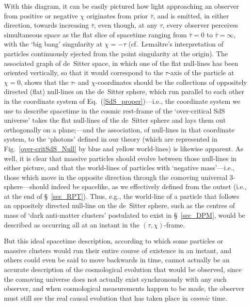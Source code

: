 With this diagram, it can be easily pictured how light approaching an observer from positive or negative $\chi$ originates from prior $\bar\tau$, and is emitted, in either direction, towards increasing $\bar\tau$, even though, at any $\tau$, every observer perceives simultaneous space as the flat slice of spacetime ranging from $\bar\tau=0$ to $\bar\tau=\infty$, with the `big bang' singularity at $\chi=-\tau$ (cf.~Lema\^{i}tre's interpretation of particles continuously ejected from the point singularity at the origin). The associated graph of de~Sitter space, in which one of the flat null-lines has been oriented vertically, so that it would correspond to the $\tau$-axis of the particle at $\chi=0$, shows that the $\tau$- and $\chi$-coordinates should be the collections of oppositely directed (flat) null-lines on the de~Sitter sphere, which run parallel to each other in the coordinate system of Eq.~(\ref{SdS_proper})---i.e., the coordinate system we use to describe spacetime in the cosmic rest-frame of the `over-critical SdS universe' takes the flat null-lines of the de~Sitter sphere and lays them out orthogonally on a plane;---and the association, of null-lines in that coordinate system, to the `photons' defined in our theory (which are represented in Fig.~\ref{over-critSdS_Null} by blue and yellow world-lines) is likewise apparent. As well, it is clear that massive particles should evolve between those null-lines in either picture, and that the world-lines of particles with `negative mass'---i.e., those which move in the opposite direction through the comoving universal 3-sphere---should indeed be spacelike, as we effectively defined from the outset (i.e., at the end of \S~\ref{sec_RPT}). Thus, e.g., the world-line of a particle that follows an oppositely directed null-line on the de~Sitter sphere, such as the centres of mass of `dark anti-matter clusters' postulated to exist in \S~\ref{sec_DPM}, would be described as occurring all at an instant in the $(\tau,\chi)$-frame.

But this ideal spacetime description, according to which some particles or massive clusters would run their entire course of existence in an instant, and others could even be said to move backwards in time, cannot actually be an accurate description of the cosmological evolution that would be observed, since the comoving universe does not actually exist synchronously with any such observer, and when cosmological measurements happen to be made, the observer must still see the real causal evolution that has taken place in \textit{cosmic} time. 

